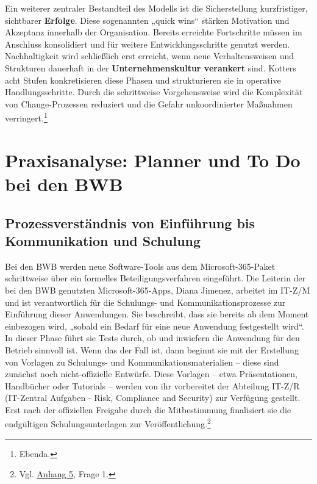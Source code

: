 \documentclass[
    12pt, 
    a4paper,
    ]{scrartcl} %
\begin{document}
Ein weiterer zentraler Bestandteil des Modells ist die Sicherstellung kurzfristiger, sichtbarer \textbf{Erfolge}. Diese sogenannten „quick wins“ stärken Motivation und Akzeptanz innerhalb der Organisation. Bereits erreichte Fortschritte müssen im Anschluss konsolidiert und für weitere Entwicklungsschritte genutzt werden. Nachhaltigkeit wird schließlich erst erreicht, wenn neue Verhaltensweisen und Strukturen dauerhaft in der \textbf{Unternehmenskultur verankert} sind. Kotters acht Stufen konkretisieren diese Phasen und strukturieren sie in operative Handlungsschritte. Durch die schrittweise Vorgehensweise wird die Komplexität von Change-Prozessen reduziert und die Gefahr unkoordinierter Maßnahmen verringert.\footnote{Ebenda.}

\section{Praxisanalyse: Planner und To Do bei den BWB}
\subsection{Prozessverständnis von Einführung bis Kommunikation und Schulung}
Bei den BWB werden neue Software-Tools aus dem Microsoft-365-Paket schrittweise über ein formelles Beteiligungsverfahren eingeführt. Die Leiterin der bei den BWB genutzten Microsoft-365-Apps, Diana Jimenez, arbeitet im IT-Z/M und ist verantwortlich für die Schulungs- und Kommunikationsprozesse zur Einführung dieser Anwendungen. Sie beschreibt, dass sie bereits ab dem Moment einbezogen wird, „sobald ein Bedarf für eine neue Anwendung festgestellt wird“. In dieser Phase führt sie Tests durch, ob und inwiefern die Anwendung für den Betrieb sinnvoll ist. Wenn das der Fall ist, dann beginnt sie mit der Erstellung von Vorlagen zu Schulungs- und Kommunikationsmaterialien – diese sind zunächst noch nicht-offizielle Entwürfe. Diese Vorlagen – etwa Präsentationen, Handbücher oder Tutorials – werden von ihr vorbereitet der Abteilung IT-Z/R (IT-Zentral Aufgaben - Risk, Compliance and Security) zur Verfügung gestellt. Erst nach der offiziellen Freigabe durch die Mitbestimmung finalisiert sie die endgültigen Schulungsunterlagen zur Veröffentlichung.\footnote{Vgl. \hyperref[sec:Anhang5]{Anhang 5}, Frage 1.}
\end{document}

